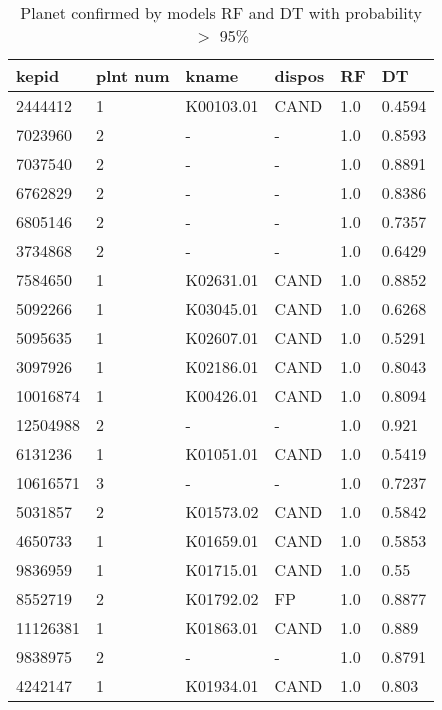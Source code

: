 \begin{table}[!htbp]
 \centering
 \caption{Planet confirmed by models RF and DT with probability $>$ 95\%}
 \label{dataRFDTcreftab} 
  \begin{tabular}
{| 
 p{}| 
 p{}| 
 p{}| 
 p{}| 
 p{}| 
 p{}| 
}\hline 
\textbf{kepid} &\textbf{plnt num} &\textbf{kname} &\textbf{dispos} &\textbf{RF} &\textbf{DT} \\ \hline 
2444412 &1 &K00103.01 &CAND &1.0 &0.4594 \\ \hline 
7023960 &2 &- &- &1.0 &0.8593 \\ \hline 
7037540 &2 &- &- &1.0 &0.8891 \\ \hline 
6762829 &2 &- &- &1.0 &0.8386 \\ \hline 
6805146 &2 &- &- &1.0 &0.7357 \\ \hline 
3734868 &2 &- &- &1.0 &0.6429 \\ \hline 
7584650 &1 &K02631.01 &CAND &1.0 &0.8852 \\ \hline 
5092266 &1 &K03045.01 &CAND &1.0 &0.6268 \\ \hline 
5095635 &1 &K02607.01 &CAND &1.0 &0.5291 \\ \hline 
3097926 &1 &K02186.01 &CAND &1.0 &0.8043 \\ \hline 
10016874 &1 &K00426.01 &CAND &1.0 &0.8094 \\ \hline 
12504988 &2 &- &- &1.0 &0.921 \\ \hline 
6131236 &1 &K01051.01 &CAND &1.0 &0.5419 \\ \hline 
10616571 &3 &- &- &1.0 &0.7237 \\ \hline 
5031857 &2 &K01573.02 &CAND &1.0 &0.5842 \\ \hline 
4650733 &1 &K01659.01 &CAND &1.0 &0.5853 \\ \hline 
9836959 &1 &K01715.01 &CAND &1.0 &0.55 \\ \hline 
8552719 &2 &K01792.02 &FP &1.0 &0.8877 \\ \hline 
11126381 &1 &K01863.01 &CAND &1.0 &0.889 \\ \hline 
9838975 &2 &- &- &1.0 &0.8791 \\ \hline 
4242147 &1 &K01934.01 &CAND &1.0 &0.803 \\ \hline 

\end{tabular}
\end{table}
